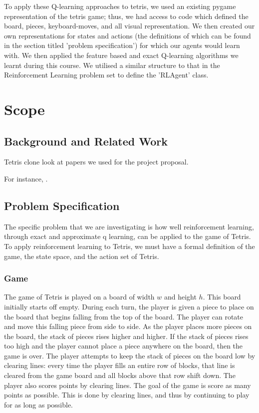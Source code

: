\documentclass[11pt]{article}
\begin{document}
\bigskip

To apply these Q-learning approaches to tetris, we used an existing pygame representation of the tetris game; thus, we had access to code which defined the board, pieces, keyboard-moves, and all visual representation. We then created our own representations for states and actions (the definitions of which can be found in the section titled 'problem specification') for which our agents would learn with. We then applied the feature based and exact Q-learning algorithms we learnt during this course. We utilised a similar structure to that in the Reinforcement Learning problem set to define the 'RLAgent' class.

\section{Scope}

\subsection{Background and Related Work}

Tetris clone
look at papers we used for the project proposal.

For instance, \cite{hochreiter1997long}.


\subsection{Problem Specification}
The specific problem that we are investigating is how well reinforcement learning, through exact and approximate q learning, can be applied to the game of Tetris. To apply reinforcement learning to Tetris, we must have a formal definition of the game, the state space, and the action set of Tetris.

\subsubsection{Game}
The game of Tetris is played on a board of width $w$ and height $h$. This board initially starts off empty. During each turn, the player is given a piece to place on the board that begins falling from the top of the board. The player can rotate and move this falling piece from side to side. As the player places more pieces on the board, the stack of pieces rises higher and higher. If the stack of pieces rises too high and the player cannot place a piece anywhere on the board, then the game is over. The player attempts to keep the stack of pieces on the board low by clearing lines: every time the player fills an entire row of blocks, that line is cleared from the game board and all blocks above that row shift down. The player also scores points by clearing lines. The goal of the game is score as many points as possible. This is done by clearing lines, and thus by continuing to play for as long as possible.
\end{document}
